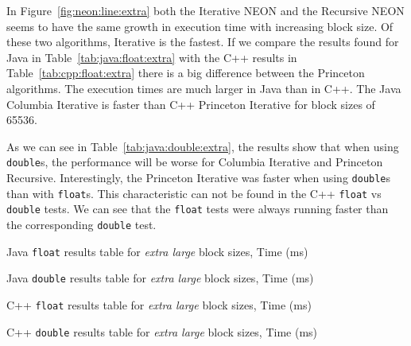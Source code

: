 In Figure~\ref{fig:neon:line:extra} both the Iterative NEON and the Recursive NEON seems to have the same growth in execution time with increasing block size. Of these two algorithms, Iterative is the fastest. If we compare the results found for Java in Table~\ref{tab:java:float:extra} with the C++ results in Table~\ref{tab:cpp:float:extra} there is a big difference between the Princeton algorithms. The execution times are much larger in Java than in C++. The Java Columbia Iterative is faster than C++ Princeton Iterative for block sizes of 65536.

As we can see in Table~\ref{tab:java:double:extra}, the results show that when using \texttt{double}s, the performance will be worse for Columbia Iterative and Princeton Recursive. Interestingly, the Princeton Iterative was faster when using \texttt{double}s than with \texttt{float}s. This characteristic can not be found in the C++ \texttt{float} vs \texttt{double} tests. We can see that the \texttt{float} tests were always running faster than the corresponding \texttt{double} test.  

\begin{table}
    \centering
    \caption{Java \texttt{float} results table for \emph{extra large} block sizes, Time (ms)}
    \label{tab:java:float:extra}
    
\end{table}

\begin{table}
    \centering
    \caption{Java \texttt{double} results table for \emph{extra large} block sizes, Time (ms)}
    \label{tab:java:double:extra}
    \resizebox{\columnwidth}{!}{
        
    }
\end{table}

\begin{table}
    \centering
    \caption{C++ \texttt{float} results table for \emph{extra large} block sizes, Time (ms)}
    \label{tab:cpp:float:extra}
    \resizebox{\columnwidth}{!}{
        
    }
\end{table}

\begin{table}
    \centering
    \caption{C++ \texttt{double} results table for \emph{extra large} block sizes, Time (ms)}
    \label{tab:cpp:double:extra}
    \resizebox{\columnwidth}{!}{
        
    }
\end{table}

